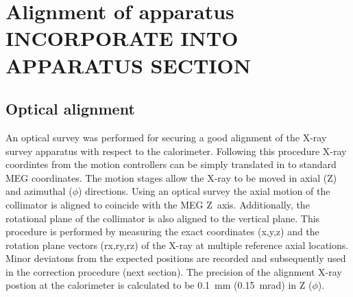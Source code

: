 \section{Alignment of apparatus INCORPORATE INTO APPARATUS SECTION}\label{sec:alignment}
\subsection{Optical alignment}

An optical survey was performed for securing a good alignment of the
X-ray survey apparatus with respect to the calorimeter.  Following
this procedure X-ray coordintes from the motion controllers 
can be simply translated in to standard MEG coordinates.
The motion stages allow the X-ray to be moved in axial (Z) and
azimuthal ($\phi$) directions.  Using  an optical survey the axial
motion of the collimator is aligned to coincide with the MEG Z~axis.
Additionally, the rotational plane of the collimator is also aligned
to the vertical plane.  This procedure is performed by measuring the
exact coordinates (x,y,z) and the rotation plane vectors (rx,ry,rz) of
the X-ray at multiple reference axial locations.  Minor
deviatons from the expected positions are recorded and subsequently
used in the correction procedure (next section).  The precision of the
alignment X-ray postion at the calorimeter is calculated to be 0.1~mm
(0.15~mrad) in Z ($\phi$).

